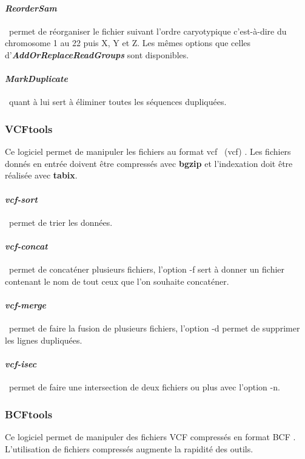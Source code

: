 \paragraph*{\textit{ReorderSam}} ~permet de réorganiser le fichier suivant l'\gls{ordre caryotypique}  c'est-à-dire du chromosome 1 au 22 puis X, Y et Z.  Les mêmes options que celles d'\textit{\textbf{AddOrReplaceReadGroups}} sont disponibles.
\paragraph*{\textit{MarkDuplicate}} ~quant à lui sert à éliminer toutes les séquences dupliquées.

\subsubsection{VCFtools} 
Ce logiciel permet de manipuler les fichiers au format  \acrlong{vcf} ~(\acrshort{vcf}) \citep{VCF}. Les fichiers donnés en entrée doivent être compressés avec \textbf{bgzip} et l'indexation doit être réalisée avec \textbf{tabix}.

\paragraph*{\textit{vcf-sort}} ~permet de trier les données.
\paragraph*{\textit{vcf-concat}} ~permet de concaténer plusieurs fichiers, l'option -f sert à donner un fichier contenant le nom de tout ceux que l'on souhaite concaténer.
\paragraph*{\textit{vcf-merge}} ~permet de faire la fusion de plusieurs fichiers, l'option -d permet de supprimer les lignes dupliquées.
\paragraph*{\textit{vcf-isec}} ~permet de faire une intersection de deux fichiers ou plus avec l'option -n.

\subsubsection{BCFtools}

Ce logiciel permet de manipuler des fichiers VCF compressés en format BCF \citep{BCF}. L'utilisation de fichiers compressés augmente la rapidité des outils. 

